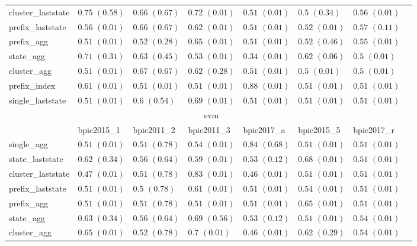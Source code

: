 \documentclass[twoside,11pt]{Latex/Classes/PhDthesisPSnPDF}
\begin{document}
\begin{table}[h]
{\begin{tabular}{llllllll}
			cluster\_laststate & $0.75$ ${(0.58)}$ & $0.66$ ${(0.67)}$ & $0.72$ ${(0.01)}$ & $0.51$ ${(0.01)}$ & $0.5$ ${(0.34)}$ & $0.56$ ${(0.01)}$ \\
			prefix\_laststate & $0.56$ ${(0.01)}$ & $0.66$ ${(0.67)}$ & $0.62$ ${(0.01)}$ & $0.51$ ${(0.01)}$ & $0.52$ ${(0.01)}$ & $0.57$ ${(0.11)}$ \\
			prefix\_agg & $0.51$ ${(0.01)}$ & $0.52$ ${(0.28)}$ & $0.65$ ${(0.01)}$ & $0.51$ ${(0.01)}$ & $0.52$ ${(0.46)}$ & $0.55$ ${(0.01)}$ \\
			state\_agg & $0.71$ ${(0.31)}$ & $0.63$ ${(0.45)}$ & $0.53$ ${(0.01)}$ & $0.34$ ${(0.01)}$ & $0.62$ ${(0.06)}$ & $0.5$ ${(0.01)}$ \\
			cluster\_agg & $0.51$ ${(0.01)}$ & $0.67$ ${(0.67)}$ & $0.62$ ${(0.28)}$ & $0.51$ ${(0.01)}$ & $0.5$ ${(0.01)}$ & $0.5$ ${(0.01)}$ \\
			prefix\_index & $0.61$ ${(0.01)}$ & $0.51$ ${(0.01)}$ & $0.51$ ${(0.01)}$ & $0.88$ ${(0.01)}$ & $0.51$ ${(0.01)}$ & $0.51$ ${(0.01)}$ \\
			single\_laststate & $0.51$ ${(0.01)}$ & $0.6$ ${(0.54)}$ & $0.69$ ${(0.01)}$ & $0.51$ ${(0.01)}$ & $0.51$ ${(0.01)}$ & $0.51$ ${(0.01)}$ \\
			\bottomrule
			\toprule
			& \multicolumn{5}{c}{svm}
			\\
			& bpic2015\_1 & bpic2011\_2 & bpic2011\_3 & bpic2017\_a & bpic2015\_5 & bpic2017\_r
			\\ \midrule
			single\_agg & $0.51$ ${(0.01)}$ & $0.51$ ${(0.78)}$ & $0.54$ ${(0.01)}$ & $0.84$ ${(0.68)}$ & $0.51$ ${(0.01)}$ & $0.51$ ${(0.01)}$ \\
			state\_laststate & $0.62$ ${(0.34)}$ & $0.56$ ${(0.64)}$ & $0.59$ ${(0.01)}$ & $0.53$ ${(0.12)}$ & $0.68$ ${(0.01)}$ & $0.51$ ${(0.01)}$ \\
			cluster\_laststate & $0.47$ ${(0.01)}$ & $0.51$ ${(0.78)}$ & $0.83$ ${(0.01)}$ & $0.46$ ${(0.01)}$ & $0.51$ ${(0.01)}$ & $0.51$ ${(0.01)}$ \\
			prefix\_laststate & $0.51$ ${(0.01)}$ & $0.5$ ${(0.78)}$ & $0.61$ ${(0.01)}$ & $0.51$ ${(0.01)}$ & $0.54$ ${(0.01)}$ & $0.51$ ${(0.01)}$ \\
			prefix\_agg & $0.51$ ${(0.01)}$ & $0.51$ ${(0.78)}$ & $0.51$ ${(0.01)}$ & $0.51$ ${(0.01)}$ & $0.65$ ${(0.01)}$ & $0.51$ ${(0.01)}$ \\
			state\_agg & $0.63$ ${(0.34)}$ & $0.56$ ${(0.64)}$ & $0.69$ ${(0.56)}$ & $0.53$ ${(0.12)}$ & $0.51$ ${(0.01)}$ & $0.54$ ${(0.01)}$ \\
			cluster\_agg & $0.65$ ${(0.01)}$ & $0.52$ ${(0.78)}$ & $0.7$ ${(0.01)}$ & $0.46$ ${(0.01)}$ & $0.62$ ${(0.29)}$ & $0.54$ ${(0.01)}$ \\

\end{tabular}}
\end{table}
\end{document}

